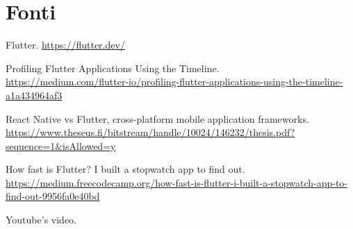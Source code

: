 \documentclass[a4paper]{article}
\begin{document}
\section*{Fonti}
\begin{enumerate}[label={[\arabic*]}]
	\item Flutter. \url{https://flutter.dev/}
	\item Profiling Flutter Applications Using the Timeline.\\ \url{https://medium.com/flutter-io/profiling-flutter-applications-using-the-timeline-a1a434964af3}
	\item React Native vs Flutter, cross-platform mobile application frameworks. \\ \url{https://www.theseus.fi/bitstream/handle/10024/146232/thesis.pdf?sequence=1\&isAllowed=y}
	\item How fast is Flutter? I built a stopwatch app to find out. \url{https://medium.freecodecamp.org/how-fast-is-flutter-i-built-a-stopwatch-app-to-find-out-9956fa0e40bd}
	\item Youtube's video.
\end{enumerate}
\end{document}
